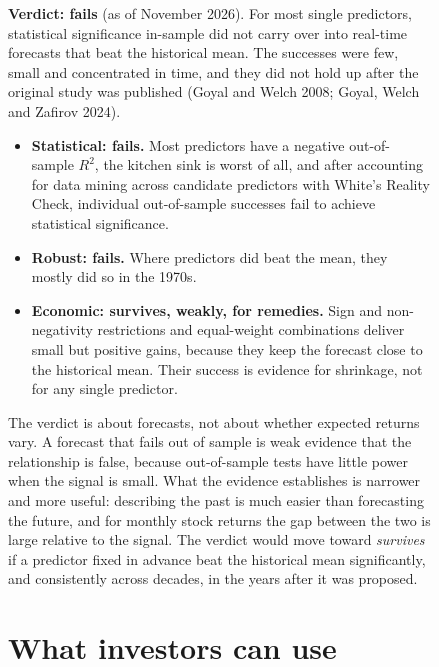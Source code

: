 \begin{figure}[htbp]
\begin{callout}
\textbf{Verdict: fails} (as of November 2026). For most single predictors, statistical significance in-sample did not carry over into real-time forecasts that beat the historical mean. The successes were few, small and concentrated in time, and they did not hold up after the original study was published (Goyal and Welch 2008; Goyal, Welch and Zafirov 2024).
\end{callout}

\begin{itemize}
  \item \textbf{Statistical: fails.} Most predictors have a negative out-of-sample $R^2$, the kitchen sink is worst of all, and after accounting for data mining across candidate predictors with White's Reality Check, individual out-of-sample successes fail to achieve statistical significance.
  \item \textbf{Robust: fails.} Where predictors did beat the mean, they mostly did so in the 1970s.
  \item \textbf{Economic: survives, weakly, for remedies.} Sign and non-negativity restrictions and equal-weight combinations deliver small but positive gains, because they keep the forecast close to the historical mean. Their success is evidence for shrinkage, not for any single predictor.
\end{itemize}

The verdict is about forecasts, not about whether expected returns vary. A forecast that fails out of sample is weak evidence that the relationship is false, because out-of-sample tests have little power when the signal is small. What the evidence establishes is narrower and more useful: describing the past is much easier than forecasting the future, and for monthly stock returns the gap between the two is large relative to the signal. The verdict would move toward \emph{survives} if a predictor fixed in advance beat the historical mean significantly, and consistently across decades, in the years after it was proposed.

\section{What investors can use}
\label{sec:05-investors}


\end{figure}
